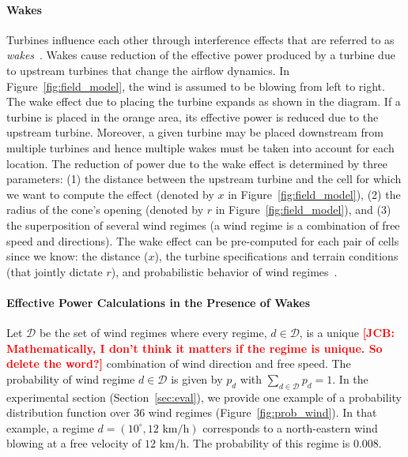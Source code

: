 \documentclass[preprint,12pt]{elsarticle}
\newcommand{\todo}[1]{{\textcolor{red}{\bf {#1}}}}
\begin{document}
\paragraph{Wakes}
Turbines influence each other through interference effects that are
referred to as \emph{wakes}~\cite{jensen1983note,shakoor2016wake}.
Wakes cause reduction of the effective power produced by a turbine due
to upstream turbines that change the airflow dynamics. In
Figure~\ref{fig:field_model}, the wind is assumed to be
blowing from left to right. The wake effect due to placing the turbine
expands as shown in the diagram.
If a turbine is placed in the orange area, its effective power is
reduced due to the upstream turbine.
Moreover, a given turbine may be placed downstream from multiple turbines and hence
multiple wakes must be taken into account for each location.  The
reduction of power due to the wake effect is determined by three
parameters: (1) the distance between the upstream turbine and the cell
for which we want to compute the effect (denoted by $x$ in
Figure~\ref{fig:field_model}), (2) the radius of the cone's opening
(denoted by $r$ in Figure~\ref{fig:field_model}), and (3) the
superposition of several wind regimes (a wind regime is a combination
of free speed and directions).  The wake effect can be pre-computed
for each pair of cells since we know: the distance ($x$), the turbine
specifications and terrain conditions (that jointly dictate $r$), and
probabilistic behavior of wind regimes~\cite{Zhang2014}.
	 
\paragraph{Effective Power Calculations in the Presence of Wakes} 
Let $\mathcal{D}$ be the set of wind regimes where every regime, $d\in \mathcal{D}$, is a unique \todo{[JCB: Mathematically, I don't think it matters if the regime is unique. So delete the word?]} combination of wind direction and free speed. 
The probability of wind regime 
$d \in \mathcal{D}$ is given by $p_d$ with $\sum_{d \in \mathcal{D}}^{} p_d = 1$. In the experimental section (Section~\ref{sec:eval}),
we provide one example of a probability distribution 
function over $36$ wind regimes (Figure~\ref{fig:prob_wind}). In that example, 
a regime $d=(10^\circ, 12 \mbox{ km/h})$ corresponds to a north-eastern wind blowing at a free velocity of $12\mbox{ km/h}$. The
probability of this regime is $0.008$.
\end{document}

